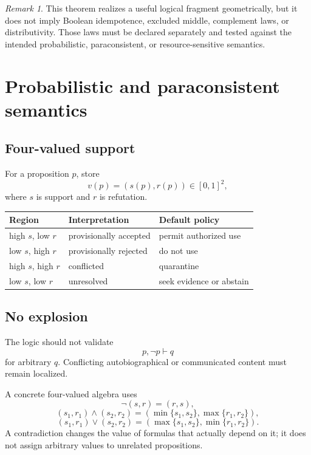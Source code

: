 \documentclass[11pt]{article}
\theoremstyle{definition}
\theoremstyle{remark}
\newtheorem{remark}[theorem]{Remark}
\begin{document}
\begin{remark}
This theorem realizes a useful logical fragment geometrically, but it does not imply Boolean idempotence, excluded middle, complement laws, or distributivity. Those laws must be declared separately and tested against the intended probabilistic, paraconsistent, or resource-sensitive semantics.
\end{remark}

\section{Probabilistic and paraconsistent semantics}

\subsection{Four-valued support}

For a proposition \(p\), store
\[
v(p)=(s(p),r(p))\in[0,1]^2,
\]
where \(s\) is support and \(r\) is refutation.

\begin{center}
\begin{tabular}{lll}
\toprule
Region & Interpretation & Default policy \\
\midrule
high \(s\), low \(r\) & provisionally accepted & permit authorized use \\
low \(s\), high \(r\) & provisionally rejected & do not use \\
high \(s\), high \(r\) & conflicted & quarantine \\
low \(s\), low \(r\) & unresolved & seek evidence or abstain \\
\bottomrule
\end{tabular}
\end{center}

\subsection{No explosion}

The logic should not validate
\[
p,\neg p\vdash q
\]
for arbitrary \(q\). Conflicting autobiographical or communicated content must remain localized.

A concrete four-valued algebra uses
\[
\neg(s,r)=(r,s),
\]
\[
(s_1,r_1)\wedge(s_2,r_2)
=
(\min\{s_1,s_2\},\max\{r_1,r_2\}),
\]
\[
(s_1,r_1)\vee(s_2,r_2)
=
(\max\{s_1,s_2\},\min\{r_1,r_2\}).
\]
A contradiction changes the value of formulas that actually depend on it; it does not assign arbitrary values to unrelated propositions.
\end{document}
